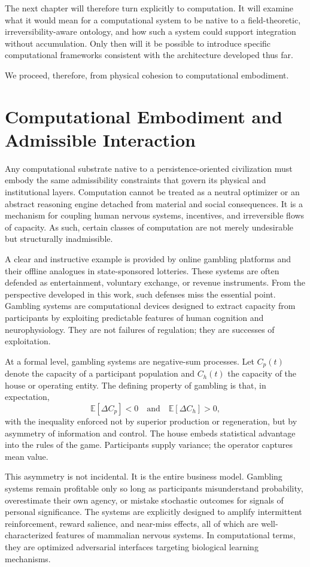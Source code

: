 \documentclass[12pt,oneside]{book}
\begin{document}
The next chapter will therefore turn explicitly to computation. It will examine what it would mean for a computational system to be native to a field-theoretic, irreversibility-aware ontology, and how such a system could support integration without accumulation. Only then will it be possible to introduce specific computational frameworks consistent with the architecture developed thus far.

We proceed, therefore, from physical cohesion to computational embodiment.

\chapter{Computational Embodiment and Admissible Interaction}

Any computational substrate native to a persistence-oriented civilization must embody the same admissibility constraints that govern its physical and institutional layers. Computation cannot be treated as a neutral optimizer or an abstract reasoning engine detached from material and social consequences. It is a mechanism for coupling human nervous systems, incentives, and irreversible flows of capacity. As such, certain classes of computation are not merely undesirable but structurally inadmissible.

A clear and instructive example is provided by online gambling platforms and their offline analogues in state-sponsored lotteries. These systems are often defended as entertainment, voluntary exchange, or revenue instruments. From the perspective developed in this work, such defenses miss the essential point. Gambling systems are computational devices designed to extract capacity from participants by exploiting predictable features of human cognition and neurophysiology. They are not failures of regulation; they are successes of exploitation.

At a formal level, gambling systems are negative-sum processes. Let \(C_p(t)\) denote the capacity of a participant population and \(C_h(t)\) the capacity of the house or operating entity. The defining property of gambling is that, in expectation,
\[
\mathbb{E}[\Delta C_p] < 0 \quad \text{and} \quad \mathbb{E}[\Delta C_h] > 0,
\]
with the inequality enforced not by superior production or regeneration, but by asymmetry of information and control. The house embeds statistical advantage into the rules of the game. Participants supply variance; the operator captures mean value.

This asymmetry is not incidental. It is the entire business model. Gambling systems remain profitable only so long as participants misunderstand probability, overestimate their own agency, or mistake stochastic outcomes for signals of personal significance. The systems are explicitly designed to amplify intermittent reinforcement, reward salience, and near-miss effects, all of which are well-characterized features of mammalian nervous systems. In computational terms, they are optimized adversarial interfaces targeting biological learning mechanisms.
\end{document}

